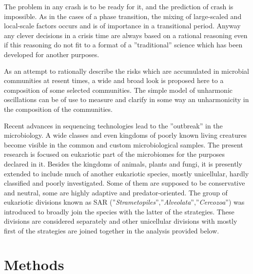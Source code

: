 \documentclass[a4paper]{article}
\begin{document}
The problem in any crash is to be ready for it, and the prediction of crash is impossible. As in the cases of a phase transition, the mixing of large-scaled and local-scale factors occurs and is of importance in a transitional period. Anyway any clever decisions in a crisis time are always based on a rational reasoning even if this reasoning do not fit to a format of a ''traditional'' science which has been developed for another purposes.

As an attempt to rationally describe the risks which are accumulated in microbial communities at resent times, a wide and broad look is proposed here to a composition of some selected communities. The simple model of unharmonic oscillations can be of use to measure and clarify in some way an unharmonicity in the composition of the communities.

Recent advances in sequencing technologies lead to the ''outbreak'' in the microbiology. A wide classes and even kingdoms of poorly known living creatures become visible in the common and custom microbiological samples. The present research is focused on eukariotic part of the microbiomes for the purposes declared in it. Besides the kingdoms of animals, plants and fungi, it is presently extended to include much of another eukariotic species, mostly unicellular, hardly classified and poorly investigated. Some of them are supposed to be conservative and neutral, some are highly adaptive and predator-oriented. The group of eukariotic divisions known as SAR (''\textit{Strametopiles}'',''\textit{Alveolata}'',''\textit{Cercozoa}'') was introduced to broadly join the species with the latter of the strategies. These divisions are considered separately and other unicellular divisions with mostly first of the strategies are joined together in the analysis provided below.


\section{Methods} 



\end{document}
